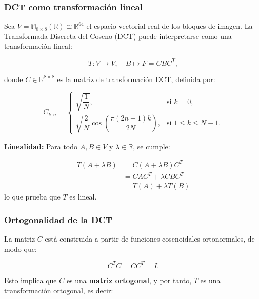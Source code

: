 \documentclass[8pt,a4paper]{article}
\theoremstyle{definition}
\theoremstyle{remark}
\begin{document}
\begin{multicols}{2}
            \subsubsection{DCT como transformación lineal}
            
            Sea \( V = \mathbb{M}_{8 \times 8}(\mathbb{R}) \cong \mathbb{R}^{64} \) el espacio vectorial real de los bloques de imagen. La Transformada Discreta del Coseno (DCT) puede interpretarse como una transformación lineal:
            
            \[
            T: V \longrightarrow V, \quad B \mapsto F = CBC^T,
            \]
            
            donde \( C \in \mathbb{R}^{8 \times 8} \) es la matriz de transformación DCT, definida por:
            
            \[
            C_{k,n} = 
            \begin{cases}
            \sqrt{\dfrac{1}{N}}, & \text{si } k = 0, \\
            \sqrt{\dfrac{2}{N}} \cos\left( \dfrac{\pi(2n + 1)k}{2N} \right), & \text{si } 1 \leq k \leq N-1.
            \end{cases}
            \]
            

            \textbf{Linealidad:} Para todo \( A, B \in V \) y \( \lambda \in \mathbb{R} \), se cumple:

            \begin{align*}
            T(A + \lambda B) &= C(A + \lambda B)C^T \\
                 &= CAC^T + \lambda CBC^T \\
                 &= T(A) + \lambda T(B)
            \end{align*} lo que prueba que \( T \) es lineal.
            
            \subsubsection{Ortogonalidad de la DCT}
            
            La matriz \( C \) está construida a partir de funciones cosenoidales ortonormales, de modo que:
            
            \[
            C^T C = C C^T = I.
            \]
            
            Esto implica que \( C \) es una \textbf{matriz ortogonal}, y por tanto, \( T \) es una transformación ortogonal, es decir:
            

\end{multicols}
\end{document}

